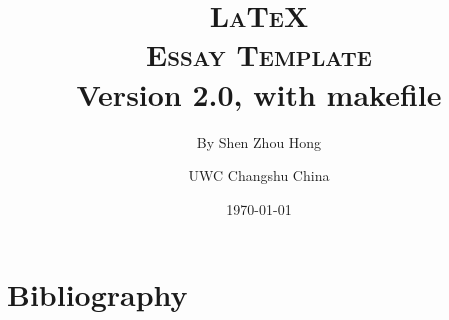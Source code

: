 \documentclass[12pt, a4paper, final, onecolumn, titlepage]{article}
\title{\textbf{\textsc{\LaTeX \\ Essay Template}} \\ Version 2.0, with makefile}
\author{By Shen Zhou Hong \and UWC Changshu China}
\date{\today}
\begin{document}
\maketitle
\tableofcontents
\clearpage



\clearpage
\nocite{*}
\section{Bibliography}
\printbibliography[heading=none]

\end{document}
